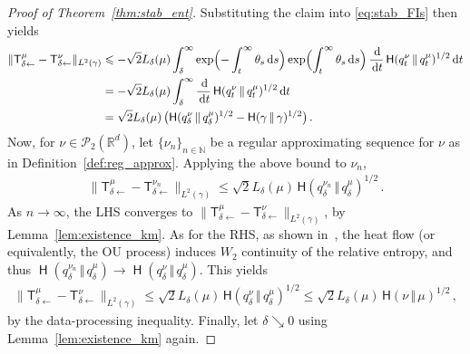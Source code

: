 \documentclass[12pt]{article}
\newcommand{\cP}{\mathcal{P}}
\newcommand{\RR}{\mathbb{R}}
\newcommand{\R}{\RR}
\newcommand{\N}{\mathbb{N}}
\newcommand{\1}{\mathds{1}}
\newcommand*{\rd}{\mathrm{d}}
\newcommand*{\dd}{\, \rd}
\newcommand{\mmid}{\,\Vert\,}
\DeclareMathOperator*{\KL}{\mathsf{H}}
\renewcommand{\leq}{\leqslant}
\renewcommand{\le}{\leqslant}
\newcommand{\KM}{\mathsf T}
\theoremstyle{plain}
\theoremstyle{definition}
\theoremstyle{remark}
\begin{document}
\begin{proof}[Proof of Theorem~\ref{thm:stab_ent}]
Substituting the claim into \eqref{eq:stab_FIs} then yields
\begin{align*}
     \|\mathsf T_{\delta\gets}^{\mu} - \mathsf T_{\delta\gets}^{\nu}\|_{L^2(\gamma)} &\leq -\sqrt{2}L_\delta(\mu) \int_\delta^\infty \exp\Bigl(-\int_t^\infty \theta_s \dd s\Bigr) \exp\Bigl(\int_t^\infty \theta_s \dd s\Bigr)\,\frac{\dd}{\dd t}\,{\mathsf H}(q_t^\nu\mmid q_t^\mu)^{1/2} \dd t \\
    &= -\sqrt{2}L_\delta(\mu)\int_\delta^\infty \frac{\dd }{\dd t}\,\mathsf H(q_t^\nu\mmid q_t^\mu)^{1/2}\dd t\\
    &= \sqrt{2} L_\delta(\mu)\,\bigl( {\mathsf H}(q_\delta^\nu\mmid q_\delta^\mu)^{1/2} - {\mathsf H}(\gamma\mmid \gamma)^{1/2}\bigr)\,.
\end{align*}
Now, for $\nu \in \cP_2(\R^d)$, let $\{\nu_n\}_{n\in\N}$ be a regular approximating sequence for $\nu$ as in Definition~\ref{def:reg_approx}.
Applying the above bound to $\nu_n$,
\begin{align*}
     \|\mathsf T_{\delta\gets}^{\mu} - \mathsf T_{\delta\gets}^{\nu_n}\|_{L^2(\gamma)}
    \le \sqrt{2} L_\delta(\mu)\,{\mathsf H}(q_\delta^{\nu_n}\mmid q_\delta^\mu)^{1/2}\,.
\end{align*}
As $n\to\infty$, the LHS converges to $\|\KM^\mu_{\delta\gets} - \KM^\nu_{\delta\gets}\|_{L^2(\gamma)}$, by Lemma~\ref{lem:existence_km}.
As for the RHS, as shown in~\citet[Corollary 4]{PolWu16WassCont}, the heat flow (or equivalently, the OU process) induces $W_2$ continuity of the relative entropy, and thus $\KL(q_\delta^{\nu_n} \mmid q_\delta^\mu) \to \KL(q_\delta^\nu \mmid q_\delta^\mu)$.
This yields
\begin{align*}
     \|\mathsf T_{\delta\gets}^{\mu} - \mathsf T_{\delta\gets}^{\nu}\|_{L^2(\gamma)}
    \le \sqrt{2} L_\delta(\mu)\,{\mathsf H}(q_\delta^{\nu}\mmid q_\delta^\mu)^{1/2}
    \le \sqrt{2} L_\delta(\mu)\,{\mathsf H}(\nu\mmid \mu)^{1/2}\,,
\end{align*}
by the data-processing inequality.
Finally, let $\delta\searrow 0$ using Lemma~\ref{lem:existence_km} again.
\end{proof}
\end{document}
